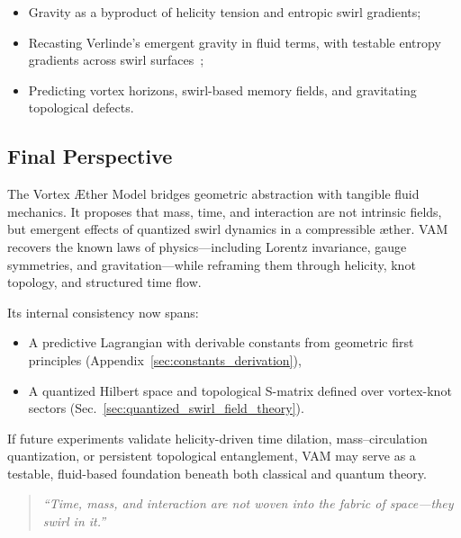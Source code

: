 \documentclass[preprint]{revtex4-2}
\begin{document}
    \begin{itemize}
        \item Gravity as a byproduct of helicity tension and entropic swirl gradients;
        \item Recasting Verlinde’s emergent gravity in fluid terms, with testable entropy gradients across swirl surfaces~\cite{kiehn2005topological};
        \item Predicting vortex horizons, swirl-based memory fields, and gravitating topological defects.
    \end{itemize}

    \subsection*{Final Perspective}
    The Vortex \AE{}ther Model bridges geometric abstraction with tangible fluid mechanics. It proposes that mass, time, and interaction are not intrinsic fields, but emergent effects of quantized swirl dynamics in a compressible æther. VAM recovers the known laws of physics—including Lorentz invariance, gauge symmetries, and gravitation—while reframing them through helicity, knot topology, and structured time flow.

    Its internal consistency now spans:

    \begin{itemize}
        \item A predictive Lagrangian with derivable constants from geometric first principles (Appendix~\ref{sec:constants_derivation}),
        \item A quantized Hilbert space and topological S-matrix defined over vortex-knot sectors (Sec.~\ref{sec:quantized_swirl_field_theory}).
    \end{itemize}

    If future experiments validate helicity-driven time dilation, mass–circulation quantization, or persistent topological entanglement, VAM may serve as a testable, fluid-based foundation beneath both classical and quantum theory.

    \begin{quote}
    \emph{``Time, mass, and interaction are not woven into the fabric of space—they swirl in it.''}
    \end{quote}

    \appendix
\end{document}
